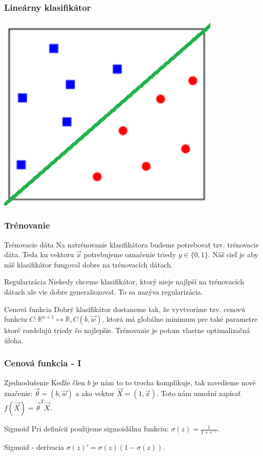 \documentclass{beamer}
\begin{document}
\begin{frame}
\frametitle{Lineárny klasifikátor}
\center
\includegraphics[width=0.8\textwidth]{lc2.png}
\end{frame}

\begin{frame}
\frametitle{Trénovanie}
\begin{block}{Trénovacie dáta}
Na natrénovanie klasifikátora budeme potrebovať tzv. trénovacie dáta. Teda ku vektoru $\vec{x}$ potrebujeme označenie triedy $y \in \{0,1\}$. Náš cieľ je aby náš klasifikátor fungoval dobre na trénovacích dátach. 
\end{block}

\begin{block}{Regularizácia}
Niekedy chceme klasifikátor, ktorý nieje najlpší na trénovacích dátach ale vie dobre generaliozovať. To sa nazýva regularizácia.
\end{block}

\begin{block}{Cenová funkcia}
Dobrý klasifikátor dostaneme tak, že vyvtvoríme tzv. cenovú funkciu $C : \mathbb{R}^{n+1} \mapsto \mathbb{R}, C(b, \vec{w})$, ktorá má globálne minimum pre také parametre ktoré rozdelujú triedy čo najlepšie. Trénovanie je potom vlastne optimalizačná úloha.
\end{block}
\end{frame}

\begin{frame}
\frametitle{Cenová funkcia - I}
\begin{block}{Zjednodušenie}
Keďže člen $b$ je nám to to trocha komplikuje, tak zavedieme nové značenie: $\vec{\theta} = (b, \vec{w})$ a ako vektor $\vec{X} = (1, \vec{x})$. Toto nám umožní zapísať $f(\vec{X}) = \vec{\theta}^T \vec{X}$.
\end{block}

\begin{block}{Sigmoid}
Pri definícii použijeme sigmoidálnu funkciu: $\sigma(z) = \frac{1}{1+e^{-z}}$.
\end{block}

\begin{block}{Sigmoid - derívacia}
$\sigma(z)' = \sigma(z) (1 - \sigma(z))$.
\end{block}
\end{frame}
\end{document}

